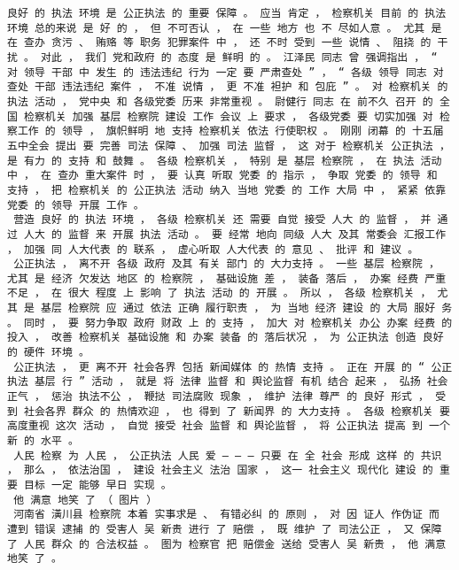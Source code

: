 \documentclass{article}
\begin{document}
\begin{Verbatim}[commandchars=\\\{\}]
 良好 的 执法 环境 是 公正执法 的 重要 保障 。 应当 肯定 ， 检察机关 目前 的 执法 环境 总的来说 是 好 的 ， 但 不可否认 ， 在 一些 地方 也 不 尽如人意 。 尤其 是 在 查办 贪污 、 贿赂 等 职务 犯罪案件 中 ， 还 不时 受到 一些 说情 、 阻挠 的 干扰 。 对此 ， 我们 党和政府 的 态度 是 鲜明 的 。 江泽民 同志 曾 强调指出 ， “ 对 领导 干部 中 发生 的 违法违纪 行为 一定 要 严肃查处 ” ， “ 各级 领导 同志 对 查处 干部 违法违纪 案件 ， 不准 说情 ， 更 不准 袒护 和 包庇 ” 。 对 检察机关 的 执法 活动 ， 党中央 和 各级党委 历来 非常重视 。 尉健行 同志 在 前不久 召开 的 全国 检察机关 加强 基层 检察院 建设 工作 会议 上 要求 ， 各级党委 要 切实加强 对 检察工作 的 领导 ， 旗帜鲜明 地 支持 检察机关 依法 行使职权 。 刚刚 闭幕 的 十五届 五中全会 提出 要 完善 司法 保障 、 加强 司法 监督 ， 这 对于 检察机关 公正执法 ， 是 有力 的 支持 和 鼓舞 。 各级 检察机关 ， 特别 是 基层 检察院 ， 在 执法 活动 中 ， 在 查办 重大案件 时 ， 要 认真 听取 党委 的 指示 ， 争取 党委 的 领导 和 支持 ， 把 检察机关 的 公正执法 活动 纳入 当地 党委 的 工作 大局 中 ， 紧紧 依靠 党委 的 领导 开展 工作 。 
 营造 良好 的 执法 环境 ， 各级 检察机关 还 需要 自觉 接受 人大 的 监督 ， 并 通过 人大 的 监督 来 开展 执法 活动 。 要 经常 地向 同级 人大 及其 常委会 汇报工作 ， 加强 同 人大代表 的 联系 ， 虚心听取 人大代表 的 意见 、 批评 和 建议 。 
 公正执法 ， 离不开 各级 政府 及其 有关 部门 的 大力支持 。 一些 基层 检察院 ， 尤其 是 经济 欠发达 地区 的 检察院 ， 基础设施 差 ， 装备 落后 ， 办案 经费 严重不足 ， 在 很大 程度 上 影响 了 执法 活动 的 开展 。 所以 ， 各级 检察机关 ， 尤其 是 基层 检察院 应 通过 依法 正确 履行职责 ， 为 当地 经济 建设 的 大局 服好 务 。 同时 ， 要 努力争取 政府 财政 上 的 支持 ， 加大 对 检察机关 办公 办案 经费 的 投入 ， 改善 检察机关 基础设施 和 办案 装备 的 落后状况 ， 为 公正执法 创造 良好 的 硬件 环境 。 
 公正执法 ， 更 离不开 社会各界 包括 新闻媒体 的 热情 支持 。 正在 开展 的 “ 公正执法 基层 行 ” 活动 ， 就是 将 法律 监督 和 舆论监督 有机 结合 起来 ， 弘扬 社会 正气 ， 惩治 执法不公 ， 鞭挞 司法腐败 现象 ， 维护 法律 尊严 的 良好 形式 ， 受到 社会各界 群众 的 热情欢迎 ， 也 得到 了 新闻界 的 大力支持 。 各级 检察机关 要 高度重视 这次 活动 ， 自觉 接受 社会 监督 和 舆论监督 ， 将 公正执法 提高 到 一个 新 的 水平 。 
 人民 检察 为 人民 ， 公正执法 人民 爱 — — — 只要 在 全 社会 形成 这样 的 共识 ， 那么 ， 依法治国 ， 建设 社会主义 法治 国家 ， 这一 社会主义 现代化 建设 的 重要 目标 一定 能够 早日 实现 。 
 他 满意 地笑 了 （ 图片 ） 
 河南省 潢川县 检察院 本着 实事求是 、 有错必纠 的 原则 ， 对 因 证人 作伪证 而 遭到 错误 逮捕 的 受害人 吴 新贵 进行 了 赔偿 ， 既 维护 了 司法公正 ， 又 保障 了 人民 群众 的 合法权益 。 图为 检察官 把 赔偿金 送给 受害人 吴 新贵 ， 他 满意 地笑 了 。 

\end{Verbatim}
\end{document}
